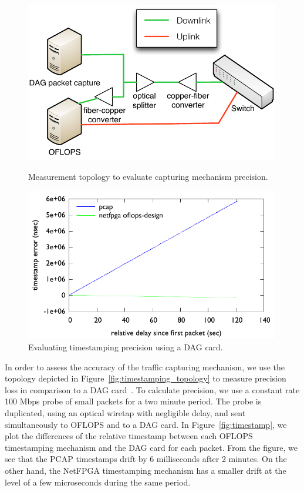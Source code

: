 \begin{figure}
\centering
  \begin{minipage}[b]{0.45\textwidth}
\centering
 \includegraphics[width=0.99\textwidth]{accuracy-topology} 
 \caption{Measurement topology to evaluate capturing mechanism precision.}
\label{fig:timestamping_topology}
\end{minipage}
\hspace{0.5cm}
  \begin{minipage}[b]{0.45\textwidth}
\centering
 \includegraphics[width=0.99\textwidth]{timer_precision} 
 \caption{Evaluating timestamping precision using a DAG card.}
\label{fig:timestamping}
\end{minipage}
\end{figure}


In order to assess the accuracy of the traffic capturing mechanism, we use the
topology depicted in Figure~\ref{fig:timestamping_topology} to measure precision
loss in comparison to a DAG card~\cite{dag_card}.  To calculate precision, we
use a constant rate 100 Mbps probe of small packets for a two minute period. The
probe is duplicated, using an optical wiretap with negligible delay, and sent
simultaneously to OFLOPS and to a DAG card. In Figure~\ref{fig:timestamp}, we
plot the differences of the relative timestamp between each OFLOPS timestamping
mechanism and the DAG card for each packet. From the figure, we see that the
PCAP timestamps drift by 6 milliseconds after 2 minutes.  On the other hand, the
NetFPGA timestamping mechanism has a smaller drift at the level of a few
microseconds during the same period.

